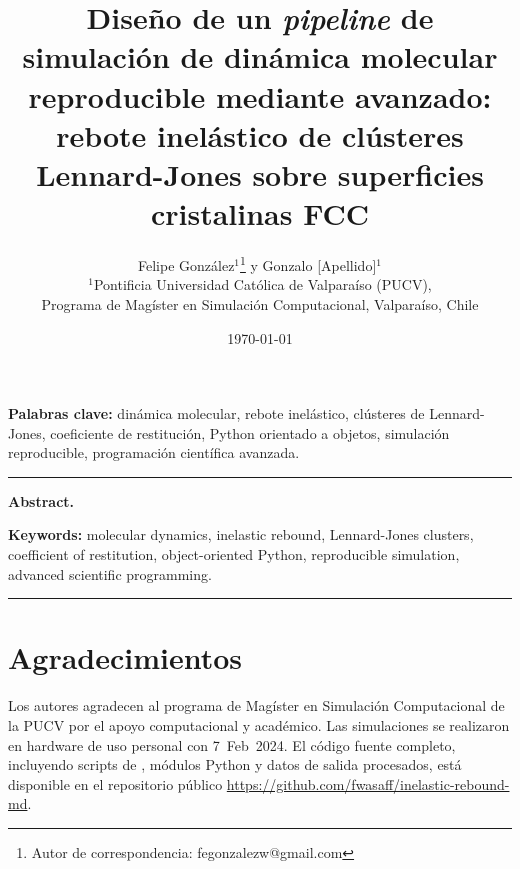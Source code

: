 \documentclass[12pt,a4paper]{article}
\title{%
    \textbf{Diseño de un \textit{pipeline} de simulación de dinámica molecular
    reproducible mediante \python{} avanzado:}\\[4pt]
    \large rebote inelástico de clústeres Lennard-Jones sobre superficies
    cristalinas FCC
}
\author{%
    Felipe González$^{1}$\thanks{Autor de correspondencia: fegonzalezw@gmail.com}
    \quad y \quad
    Gonzalo [Apellido]$^{1}$\\[6pt]
    \small $^{1}$Pontificia Universidad Católica de Valparaíso (PUCV),\\
    \small Programa de Magíster en Simulación Computacional, Valparaíso, Chile
}
\date{\today}
\begin{document}
\maketitle

\begin{abstract}

\end{abstract}

\textbf{Palabras clave:} dinámica molecular, rebote inelástico, clústeres de
Lennard-Jones, coeficiente de restitución, Python orientado a objetos,
simulación reproducible, programación científica avanzada.

\vspace{8pt}
\hrule
\vspace{8pt}

\noindent\textbf{Abstract. }\textit{}

\noindent\textbf{Keywords:} molecular dynamics, inelastic rebound, Lennard-Jones clusters,
coefficient of restitution, object-oriented Python, reproducible simulation,
advanced scientific programming.

\hrule
\vspace{12pt}

\tableofcontents
\newpage








\section*{Agradecimientos}
Los autores agradecen al programa de Magíster en Simulación Computacional de la
PUCV por el apoyo computacional y académico. Las simulaciones se realizaron en
hardware de uso personal con \lammps{} 7~Feb~2024. El código fuente completo,
incluyendo scripts de \lammps{}, módulos Python y datos de salida procesados,
está disponible en el repositorio público
\url{https://github.com/fwasaff/inelastic-rebound-md}.



\end{document}
